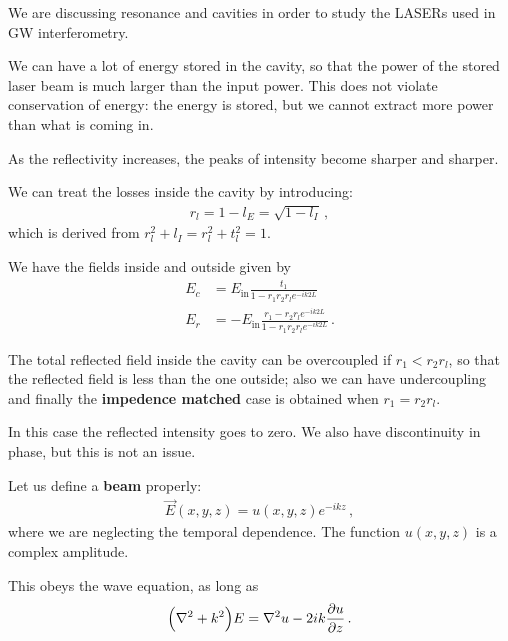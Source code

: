 \documentclass[main.tex]{subfiles}
\begin{document}

We are discussing resonance and cavities in order to study the LASERs used in GW interferometry. 

We can have a lot of energy stored in the cavity, so that the power of the stored laser beam is much larger than the input power.
This does not violate conservation of energy: the energy is stored, but we cannot extract more power than what is coming in. 

As the reflectivity increases, the peaks of intensity become sharper and sharper. 

We can treat the losses inside the cavity by introducing: 
%
\begin{align}
r_{l} = 1 - l_{E} = \sqrt{1 - l_{I}}
\,,
\end{align}
%
which is derived from \(r_l^2 + l_I = r_l^2 + t_l^2 = 1\). 

We have the fields inside and outside given by 
%
\begin{align}
E_{c} &= E _{\text{in}} \frac{t_1 }{1 - r_1 r_2 r_{l} e^{-ik2L}}  \\
E_{r} &= - E _{\text{in}} \frac{r_1 - r_2 r_{l} e^{-ik2L}}{1 - r_1 r_2 r_{l} e^{-ik 2L}}
\,.
\end{align}

The total reflected field inside the cavity can be overcoupled if \(r_1 < r_2 r_{l}\), so that the reflected field is less than the one outside; also we can have undercoupling and finally the \textbf{impedence matched} case is obtained when \(r_1 = r_2 r_{l}\). 

In this case the reflected intensity goes to zero. We also have discontinuity in phase, but this is not an issue. 

Let us define a \textbf{beam} properly: 
%
\begin{align}
\vec{E}(x, y, z) = u (x, y, z) e^{-ikz}
\,,
\end{align}
%
where we are neglecting the temporal dependence. 
The function \(u(x, y, z)\) is a complex amplitude. 

This obeys the wave equation, as long as 
%
\begin{align}
\qty(\nabla^2 + k^2) E = \nabla^2 u  - 2ik \pdv{u}{z}
\,.
\end{align}
\end{document}
